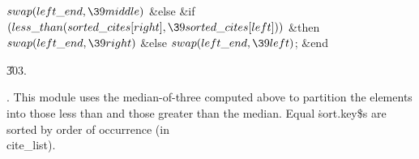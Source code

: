 $\\{swap}(\\{left\_end},\39\\{middle})$\6
\4\&{else} \&{if} $(\\{less\_than}(\\{sorted\_cites}[\\{right}],\39\\{sorted%
\_cites}[\\{left}]))$ \1\&{then}\6
$\\{swap}(\\{left\_end},\39\\{right})$\6
\4\&{else} \2\2\6
$\\{swap}(\\{left\_end},\39\\{left})$;\6
\&{end}\par
\U303.\fi

.
This module uses the median-of-three computed above to partition the
elements into those less than and those greater than the median.
Equal \.{sort.key\$}s are sorted by order of occurrence (in
\\{cite\_list}).

